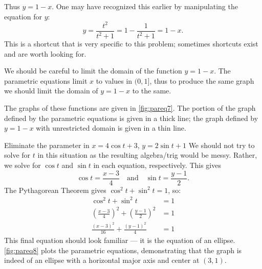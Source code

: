 \begin{example}
Thus $y=1-x$. One may have recognized this earlier by manipulating the equation for $y$:
\[y = \frac{t^2}{t^2+1} = 1-\frac{1}{t^2+1} = 1-x.\]
This is a shortcut that is very specific to this problem; sometimes shortcuts exist and are worth looking for.

We should be careful to limit the domain of the function $y=1-x$. The parametric equations limit $x$ to values in $(0,1]$, thus to produce the same graph we should limit the domain of $y=1-x$ to the same. 

The graphs of these functions are given in \autoref{fig:pareq7}. The portion of the graph defined by the parametric equations is given in a thick line; the graph defined by $y=1-x$ with unrestricted domain is given in a thin line.
\end{example}

\begin{example}\label{ex_pareq8}
Eliminate the parameter in $x=4\cos t+3$, $y= 2\sin t+1$
\solution
We should not try to solve for $t$ in this situation as the resulting algebra/trig would be messy. Rather, we solve for $\cos t$ and $\sin t$ in each equation, respectively. This gives
\[\cos t = \frac{x-3}{4} \quad \text{and}\quad \sin t=\frac{y-1}{2}.\]
The Pythagorean Theorem gives $\cos^2t+\sin^2t=1$, so:
\begin{align*}
\cos^2t+\sin^2t &=1 \\
\left(\frac{x-3}{4}\right)^2 +\left(\frac{y-1}{2}\right)^2 &=1\\
\frac{(x-3)^2}{16}+\frac{(y-1)^2}{4} &=1
\end{align*}
%
%
This final equation should look familiar --- it is the equation of an ellipse. \autoref{fig:pareq8} plots the parametric equations, demonstrating that the graph is indeed of an ellipse with a horizontal major axis and center at $(3,1)$.
\end{example}

